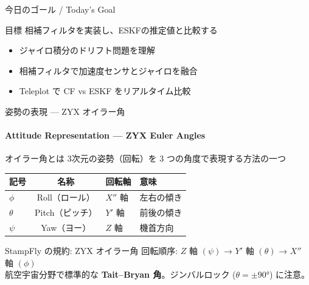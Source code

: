 \documentclass[aspectratio=169, 14pt]{beamer}
\begin{document}
\begin{frame}
  \titlepage
\end{frame}

\begin{frame}{今日のゴール / Today's Goal}
  \begin{block}{目標}
    相補フィルタを実装し、ESKFの推定値と比較する
  \end{block}

  \vspace{1em}

  \begin{itemize}
    \item ジャイロ積分のドリフト問題を理解
    \item 相補フィルタで加速度センサとジャイロを融合
    \item Teleplot で CF vs ESKF をリアルタイム比較
  \end{itemize}
\end{frame}

\begin{frame}{姿勢の表現 --- ZYX オイラー角}
  \framesubtitle{Attitude Representation --- ZYX Euler Angles}

  \begin{block}{オイラー角とは}
    3次元の姿勢（回転）を 3 つの角度で表現する方法の一つ
  \end{block}

  \vspace{0.3em}

  {\small
  \begin{tabular}{lcll}
    \hline
    \textbf{記号} & \textbf{名称} & \textbf{回転軸} & \textbf{意味} \\
    \hline
    $\phi$   & Roll（ロール）  & $X''$ 軸 & 左右の傾き \\
    $\theta$ & Pitch（ピッチ） & $Y'$ 軸  & 前後の傾き \\
    $\psi$   & Yaw（ヨー）     & $Z$ 軸   & 機首方向 \\
    \hline
  \end{tabular}
  }

  \vspace{0.5em}

  \begin{alertblock}{StampFly の規約: ZYX オイラー角}
    {\small
    回転順序: $Z$ 軸 $(\psi)$ → $Y'$ 軸 $(\theta)$ → $X''$ 軸 $(\phi)$\\[2pt]
    航空宇宙分野で標準的な \textbf{Tait--Bryan 角}。ジンバルロック ($\theta = \pm 90°$) に注意。
    }
  \end{alertblock}
\end{frame}
\end{document}

